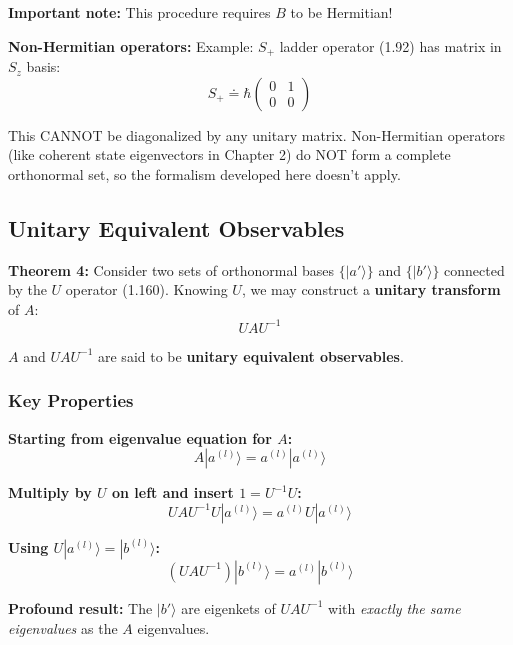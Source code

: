 \documentclass[11pt,a4paper]{article}
\begin{document}
\textbf{Important note:} This procedure requires $B$ to be Hermitian! 

\textbf{Non-Hermitian operators:}
Example: $S_+$ ladder operator (1.92) has matrix in $S_z$ basis:
\begin{equation}
S_+ \doteq \hbar\begin{pmatrix}
0 & 1 \\
0 & 0
\end{pmatrix}
\tag{1.178}
\end{equation}

This CANNOT be diagonalized by any unitary matrix. Non-Hermitian operators (like coherent state eigenvectors in Chapter 2) do NOT form a complete orthonormal set, so the formalism developed here doesn't apply.

\subsection{Unitary Equivalent Observables}

\textbf{Theorem 4:} Consider two sets of orthonormal bases $\{|a'\rangle\}$ and $\{|b'\rangle\}$ connected by the $U$ operator (1.160). Knowing $U$, we may construct a \textbf{unitary transform} of $A$:
\begin{equation}
UAU^{-1}
\end{equation}

$A$ and $UAU^{-1}$ are said to be \textbf{unitary equivalent observables}.

\subsubsection{Key Properties}

\textbf{Starting from eigenvalue equation for $A$:}
\begin{equation}
A|a^{(l)}\rangle = a^{(l)}|a^{(l)}\rangle
\tag{1.179}
\end{equation}

\textbf{Multiply by $U$ on left and insert $1 = U^{-1}U$:}
\begin{equation}
UAU^{-1}U|a^{(l)}\rangle = a^{(l)}U|a^{(l)}\rangle
\tag{1.180}
\end{equation}

\textbf{Using $U|a^{(l)}\rangle = |b^{(l)}\rangle$:}
\begin{equation}
\boxed{(UAU^{-1})|b^{(l)}\rangle = a^{(l)}|b^{(l)}\rangle}
\tag{1.181}
\end{equation}

\textbf{Profound result:} The $|b'\rangle$ are eigenkets of $UAU^{-1}$ with \textit{exactly the same eigenvalues} as the $A$ eigenvalues.
\end{document}
